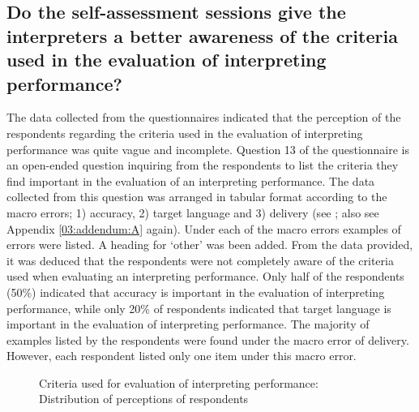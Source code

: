 \documentclass[output=paper]{langsci/langscibook}
\begin{document}
\subsection{Do the self-assessment sessions give the interpreters a better awareness of the criteria used in the evaluation of interpreting performance?}
\largerpage
The data collected from the questionnaires indicated that the perception of the respondents regarding the criteria used in the evaluation of interpreting performance was quite vague and incomplete. Question 13 of the questionnaire is an open-ended question inquiring from the respondents to list the criteria they find important in the evaluation of an interpreting performance. The data collected from this question was arranged in tabular format according to the macro errors; 1) accuracy, 2) target language and 3) delivery (see ; also see Appendix \ref{03:addendum:A} again). Under each of the macro errors examples of errors were listed. A heading for ‘other’ was been added. From the data provided, it was deduced that the respondents were not completely aware of the criteria used when evaluating an interpreting performance. Only half of the respondents (50\%) indicated that accuracy is important in the evaluation of interpreting performance, while only 20\% of respondents indicated that target language is important in the evaluation of interpreting performance. The majority of examples listed by the respondents were found under the macro error of delivery. However, each respondent listed only one item under this macro error. 

\begin{figure}
\caption{\label{fig:deysel:2}Criteria used for evaluation of interpreting performance: Distribution of perceptions of respondents}
\end{figure}
\end{document}
